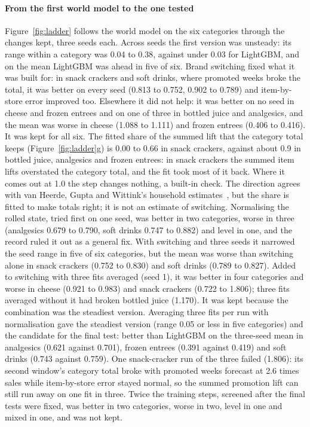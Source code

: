 \paragraph{From the first world model to the one tested}
Figure~\ref{fig:ladder} follows the world model on the six categories through
the changes kept, three seeds each. Across seeds the first version was unsteady:
its range within a category was 0.04 to 0.38, against under 0.03 for LightGBM,
and on the mean LightGBM was ahead in five of six. Brand switching fixed what it
was built for: in snack crackers and soft drinks, where promoted weeks broke the
total, it was better on every seed (0.813 to 0.752, 0.902 to 0.789) and
item-by-store error improved too. Elsewhere it did not help: it was better on
no seed in cheese and frozen entrees and on one of three in bottled juice and
analgesics, and the mean was worse in cheese (1.088 to 1.111) and frozen
entrees (0.406 to 0.416). It was kept for all six. The fitted share of the summed lift that the category total keeps
(Figure~\ref{fig:ladder}g) is 0.00 to 0.66 in snack crackers, against about 0.9
in bottled juice, analgesics and frozen entrees: in snack crackers the summed
item lifts overstated the category total, and the fit took most of it back.
Where it comes out at 1.0 the step changes nothing, a built-in check. The
direction agrees with van Heerde, Gupta and Wittink's household
estimates~\cite{vanheerde2003}, but the share is fitted to make totals right; it
is not an estimate of switching. Normalising the rolled state, tried first on
one seed, was better in two categories, worse in three (analgesics 0.679 to
0.790, soft drinks 0.747 to 0.882) and level in one, and the record ruled it
out as a general fix. With switching and three seeds it narrowed the seed
range in five of six categories, but the mean was worse than switching alone in
snack crackers (0.752 to 0.830) and soft drinks (0.789 to 0.827). Added to
switching with three fits averaged (seed 1), it was better in four categories
and worse in cheese (0.921 to 0.983) and snack crackers (0.722 to 1.806); three
fits averaged without it had broken bottled juice (1.170). It was kept because
the combination was the steadiest version. Averaging three fits per run with normalisation gave the
steadiest version (range 0.05 or less in five categories) and the candidate for
the final test: better than LightGBM on the three-seed mean in analgesics (0.621
against 0.701), frozen entrees (0.391 against 0.419) and soft drinks (0.743
against 0.759). One snack-cracker run of the three failed (1.806): its second
window's category total broke with promoted weeks forecast at 2.6 times sales
while item-by-store error stayed normal, so the summed promotion lift can still
run away on one fit in three. Twice the training steps, screened after the final
tests were fixed, was better in two categories, worse in two, level in one and
mixed in one, and was not kept.

